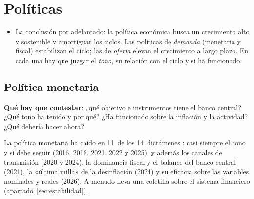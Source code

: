 \documentclass[11pt]{article}
\begin{document}
\section{Políticas}\label{sec:politicas}

\begin{itemize}
\item La conclusión por adelantado: la política económica busca un crecimiento alto y sostenible y amortiguar los ciclos. Las políticas de \emph{demanda} (monetaria y fiscal) estabilizan el ciclo; las de \emph{oferta} elevan el crecimiento a largo plazo. En cada una hay que juzgar el \emph{tono}, su relación con el ciclo y si ha funcionado.
\end{itemize}

\subsection{Política monetaria}\label{sec:monetaria}

\begin{ideaclave}
\textbf{Qué hay que contestar}: ¿qué objetivo e instrumentos tiene el banco central? ¿Qué tono ha tenido y por qué? ¿Ha funcionado sobre la inflación y la actividad? ¿Qué debería hacer ahora?
\end{ideaclave}

\begin{notaopositor}
La política monetaria ha caído en 11~de los 14~dictámenes \parencite{ATCEE2026Examenes}: casi siempre el tono y si debe seguir (2016, 2018, 2021, 2022 y 2025), y además los canales de transmisión (2020 y 2024), la dominancia fiscal y el balance del banco central (2021), la «última milla» de la desinflación (2024) y su eficacia sobre las variables nominales y reales (2026). A menudo lleva una coletilla sobre el sistema financiero (apartado~\ref{sec:estabilidad}).
\end{notaopositor}
\end{document}
